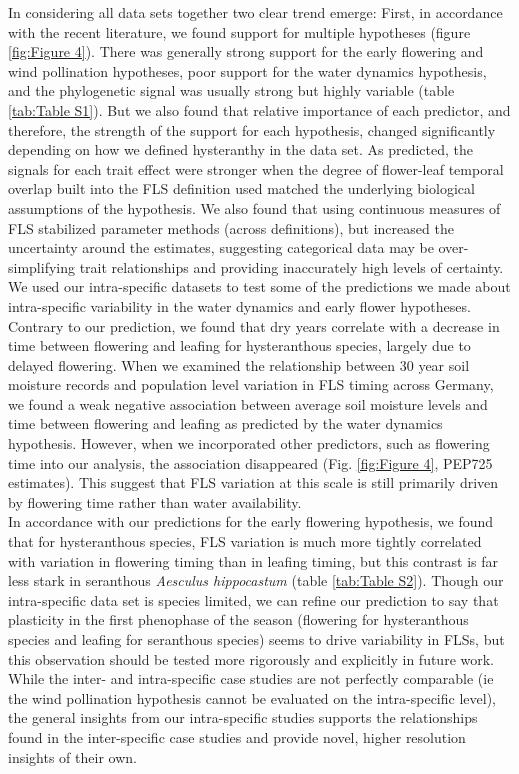 \documentclass[12pt]{article}\usepackage[]{graphicx}\usepackage[]{color}
\begin{document}
\indent In considering all data sets together two clear trend emerge: First, in accordance with the recent literature, we found support for multiple hypotheses (figure \ref{fig:Figure 4}). There was generally strong support for the early flowering and wind pollination hypotheses, poor support for the water dynamics hypothesis, and the phylogenetic signal was usually strong but highly variable (table \ref{tab:Table S1}). But we also found that relative importance of each predictor, and therefore, the strength of the support for each hypothesis, changed significantly depending on how we defined hysteranthy in the data set. As predicted, the signals for each trait effect were stronger when the degree of flower-leaf temporal overlap built into the FLS definition used matched the underlying biological assumptions of the hypothesis. We also found that using continuous measures of FLS stabilized parameter methods (across definitions), but increased the uncertainty around the estimates, suggesting categorical data may be over-simplifying trait relationships and providing inaccurately high levels of certainty.\\

\indent We used our intra-specific datasets to test some of the predictions we made about intra-specific variability in the water dynamics and early flower hypotheses. Contrary to our prediction, we found that dry years correlate with a decrease in time between flowering and leafing for hysteranthous species, largely due to delayed flowering. When we examined the relationship between 30 year soil moisture records \citep{DWD} and population level variation in FLS timing across Germany, we found a weak negative association between average soil moisture levels and time between flowering and leafing as predicted by the water dynamics hypothesis. However, when we incorporated other predictors, such as flowering time into our analysis, the association disappeared (Fig. \ref{fig:Figure 4}, PEP725 estimates). This suggest that FLS variation at this scale is still primarily driven by flowering time rather than water availability. \\ 

\indent In accordance with our predictions for the early flowering hypothesis, we found that for hysteranthous species, FLS variation is much more tightly correlated with variation in flowering timing than in leafing timing, but this contrast is far less stark in seranthous \textit{Aesculus hippocastum} (table \ref{tab:Table S2}). Though our intra-specific data set is species limited, we can refine our prediction to say that plasticity in the first phenophase of the season (flowering for hysteranthous species and leafing for seranthous species) seems to drive variability in FLSs, but this observation should be tested more rigorously and explicitly in future work. While the inter- and intra-specific case studies are not perfectly comparable (ie the wind pollination hypothesis cannot be evaluated on the intra-specific level), the general insights from our intra-specific studies supports the relationships found in the inter-specific case studies and provide novel, higher resolution insights of their own.
\end{document}
